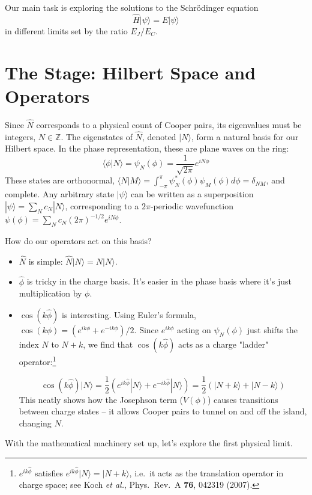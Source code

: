 \documentclass{book}
\begin{document}
Our main task is exploring the solutions to the Schr\"odinger equation \[\hat{H}|\psi\rangle = E|\psi\rangle\] in different limits set by the ratio \(E_J / E_C\).

\section{The Stage: Hilbert Space and Operators}
\label{sec:hilbert_space}

Since \(\hat{N}\) corresponds to a physical count of Cooper pairs, its eigenvalues must be integers, \(N \in \mathbb{Z}\). The eigenstates of \(\hat{N}\), denoted \(|N\rangle\), form a natural basis for our Hilbert space. In the phase representation, these are plane waves on the ring:
\begin{equation}
\langle \phi | N \rangle = \psi_N(\phi) = \frac{1}{\sqrt{2\pi}} e^{i N \phi}
\label{eq:charge_eigenstates}
\end{equation}
These states are orthonormal, \(\langle N | M \rangle = \int_{-\pi}^{\pi} \psi_N^*(\phi) \psi_M(\phi) d\phi = \delta_{NM}\), and complete. Any arbitrary state \(|\psi\rangle\) can be written as a superposition \(|\psi\rangle = \sum_N c_N |N\rangle\), corresponding to a \(2\pi\)-periodic wavefunction \(\psi(\phi) = \sum_N c_N (2\pi)^{-1/2} e^{i N \phi}\).

How do our operators act on this basis?
\begin{itemize}
    \item \(\hat{N}\) is simple: \(\hat{N} |N\rangle = N |N\rangle\).
    \item \(\hat{\phi}\) is tricky in the charge basis. It's easier in the phase basis where it's just multiplication by \(\phi\).
    \item \(\cos(k \hat{\phi})\) is interesting. Using Euler's formula, \(\cos(k \phi) = (e^{i k \phi} + e^{-i k \phi})/2\). Since \(e^{i k \phi}\) acting on \(\psi_N(\phi)\) just shifts the index \(N\) to \(N+k\), we find that \(\cos(k\hat{\phi})\) acts as a charge "ladder" operator:\footnote{%
    $e^{ik\hat{\phi}}$ satisfies $e^{ik\hat{\phi}}|N\rangle = |N+k\rangle$, i.e.\ it
    acts as the translation operator in charge space; see
    Koch \textit{et al.}, Phys.\ Rev.\ A \textbf{76}, 042319 (2007).}
    
    \begin{equation}
    \cos(k \hat{\phi}) |N\rangle = \frac{1}{2} \left( e^{ik\hat{\phi}}|N\rangle + e^{-ik\hat{\phi}}|N\rangle \right) = \frac{1}{2} (|N + k\rangle + |N - k\rangle)
    \label{eq:cos_action}
    \end{equation}
    This neatly shows how the Josephson term (\(V(\phi)\)) causes transitions between charge states – it allows Cooper pairs to tunnel on and off the island, changing \(N\).
\end{itemize}
With the mathematical machinery set up, let's explore the first physical limit.
\end{document}
